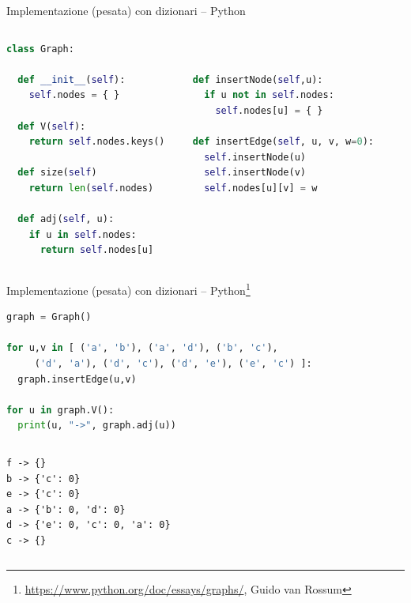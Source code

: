\begin{frame}[fragile]{Implementazione (pesata) con dizionari -- Python}

\vspace{-12pt}
\begin{columns}[T]
\begin{lstlisting}[language=python]
class Graph: 

  def __init__(self):
    self.nodes = { }

  def V(self):
    return self.nodes.keys()

  def size(self)
    return len(self.nodes)

  def adj(self, u):
    if u in self.nodes:
      return self.nodes[u]
\end{lstlisting}
\begin{lstlisting}[language=python]


  def insertNode(self,u):
    if u not in self.nodes:
      self.nodes[u] = { }

  def insertEdge(self, u, v, w=0):
    self.insertNode(u)
    self.insertNode(v)
    self.nodes[u][v] = w
\end{lstlisting}
\end{columns}

\end{frame}

\begin{frame}[fragile]{Implementazione (pesata) con dizionari -- Python\footnote{\url{https://www.python.org/doc/essays/graphs/}, Guido van Rossum}}

\vspace{-6pt}
\begingroup
\small
\begin{lstlisting}[language=python]
graph = Graph()

for u,v in [ ('a', 'b'), ('a', 'd'), ('b', 'c'), 
     ('d', 'a'), ('d', 'c'), ('d', 'e'), ('e', 'c') ]:
  graph.insertEdge(u,v)
	
for u in graph.V():
  print(u, "->", graph.adj(u))
\end{lstlisting}

\begin{columns}[T]
\begin{lstlisting}[basicstyle=\ttfamily\color{blue}]
f -> {}
b -> {'c': 0}
e -> {'c': 0}
a -> {'b': 0, 'd': 0}
d -> {'e': 0, 'c': 0, 'a': 0}
c -> {}
\end{lstlisting}
\vspace{-12pt}
\end{columns}
\endgroup

\end{frame}


